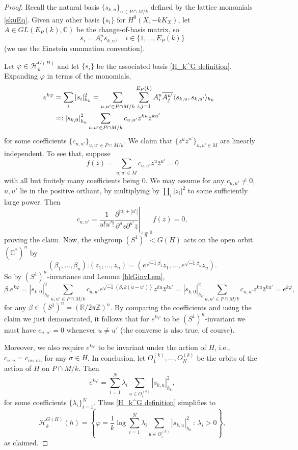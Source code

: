\documentclass{article}
\newcommand\cH{{\mathcal H}}
\newcommand{\CC}{\mathbb {C}}
\newcommand{\RR}{{\mathbb R}}
\newcommand{\ZZ}{{\mathbb Z}}
\renewcommand{\>}{\rightarrow}
\theoremstyle{plain}
\theoremstyle{definition}
\newcommand{\beq}{\begin{equation}}
\newcommand{\eeq}{\end{equation}}
\newcommand{\bpf}{\begin{proof}}
\newcommand{\epf}{\end{proof}}
\def\lb#1{\label{#1}}
\def\ran{\rangle}
\def\lan{\langle}
\def\q{\quad}
\def\vp{\varphi}
\def\i{\sqrt{-1}}
\begin{document}
\bpf
Recall the natural basis $\{s_{k,u}\}_{u\in P\cap M/k}$ defined by the
lattice monomials \eqref{skuEq}. Given any other basis $\{s_i\}$ for $H^0(X,-kK_X)$, let 
$A\in GL(E_P(k),\CC)$ be the change-of-basis matrix, so 
$$
s_i=A^u_is_{k,u}, \q i\in\{1,\ldots,E_P(k)\}
$$
(we use the Einstein summation convention).

Let $\vp\in\cH_k^{G(H)}$ and let $\{s_i\}$ be
the associated basis \eqref{H_k^G definition}.
Expanding $\vp$ in terms of the monomials,
\begin{align*}
e^{k\varphi}
&=\sum_i|s_i|_{h_k}^2=\sum_{u,u'\in P\cap M/k}
\sum_{i,j=1}^{E_P(k)}A^u_i\overline{A_j^{u'}}
\langle s_{k,u},s_{k,u'}\rangle_{h_k}
\cr
&=:
\left|s_{k,0}\right|_{h_k}^2\sum_{u,u'\in P\cap M/k}c_{u,u'}z^{ku}\bar{z}^{ku'}
\end{align*}
for some coefficients $\{c_{u,u'}\}_{u,u'\in P\cap M/k}$. 
We claim that $\{z^u\bar{z}^{u'}\}_{u,u'\in M}$ are linearly independent. 
To see that, suppose
$$
f(z)=\sum_{u,u'\in M}c_{u,u'}z^u\bar{z}^{u'}=0
$$
with all but finitely many coefficients being 0. We may assume for any $c_{u,u'}\neq0$, $u,u'$ lie in the positive orthant, by multiplying by $\displaystyle\prod_{i}\left|z_i\right|^2$ to some sufficiently large power. Then
$$
c_{u,u'}=\frac{1}{u!u'!}\left.\frac{\partial^{\left|u\right|+\left|u'\right|}}{\partial^uz\partial^{u'}\bar{z}}\right|_{z=0}f(z)=0,
$$
proving the claim. 
Now, the subgroup $(S^1)^n<G(H)$ acts on the open orbit
$(\CC^*)^n$ by 
\beq
\lb{torusactionEq}
(\beta_1,\ldots,\beta_n).(z_1,\ldots,z_n)=
(e^{\i\beta_1}z_1,\ldots,e^{\i\beta_n}z_n).
\eeq
So by $(S^1)^n$-invariance and Lemma \ref{hkGinvLem},
$$
\beta.e^{k\varphi}=
\left|s_{k,0}\right|_{h_k}^2\sum_{u,u'\in P\cap M/k}c_{u,u'}e^{\i\left\lan\beta,k\left(u-u'\right)\right\ran}z^{ku}\bar{z}^{ku'}
=
\left|s_{k,0}\right|_{h_k}^2\sum_{u,u'\in P\cap M/k}c_{u,u'}z^{ku}\bar{z}^{ku'}
=e^{k\varphi},
$$
for any $\beta\in(S^1)^n=(\RR/2\pi\ZZ)^n$.
By comparing the coefficients and using the claim we just demonstrated, it follows that for $e^{k\varphi}$ to be $(S^1)^n$-invariant we must have $c_{u,u'}=0$ whenever $u\neq u'$
(the converse is also true, of course).

Moreover, we also require $e^{k\varphi}$ to be invariant under the action of $H$, i.e., $c_{u,u}=c_{\sigma u,\sigma u}$ for any $\sigma\in H$. In conclusion, let $O^{(k)}_1,\ldots,O^{(k)}_N$ be the orbits of the action of $H$ on $P\cap M/k$. Then
$$
e^{k\varphi}=\sum_{i=1}^N\lambda_i\sum_{u\in O^{(k)}_i}|s_{k,u}|_{h_k}^2,
$$
for some coefficients $\{\lambda_i\}_{i=1}^N$. Thus 
\eqref{H_k^G definition} simplifies to
$$
\cH_k^{G(H)}(h)=\left\{\varphi=\frac{1}{k}\log\sum_{i=1}^N\lambda_i\sum_{u\in O^{(k)}_i}|s_{k,u}|_{h_k}^2\,:\,\lambda_i>0\right\},
$$
as claimed.
\epf
\end{document}
